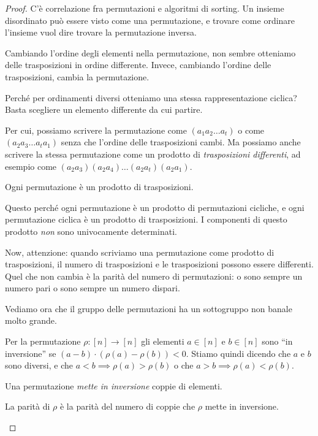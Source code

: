 \begin{proof}
C'\`e correlazione fra permutazioni e algoritmi di sorting.
Un insieme disordinato pu\`o essere visto come una permutazione, e trovare come ordinare l'insieme vuol dire trovare la permutazione inversa.

Cambiando l'ordine degli elementi nella permutazione, non sembre otteniamo delle trasposizioni in ordine differente.
Invece, cambiando l'ordine delle trasposizioni, cambia la permutazione.

Perch\'e per ordinamenti diversi otteniamo una stessa rappresentazione ciclica?
Basta scegliere un elemento differente da cui partire.

Per cui, possiamo scrivere la permutazione come $(a_1 a_2 \dots a_t)$ o come $(a_2 a_3 \dots a_t a_1)$ senza che l'ordine delle trasposizioni cambi.
Ma possiamo anche scrivere la stessa permutazione come un prodotto di \emph{trasposizioni differenti}, ad esempio come $(a_2 a_3) (a_2 a_4) \dots (a_2 a_t) (a_2 a_1)$.

\begin{prop}
	Ogni permutazione \`e un prodotto di trasposizioni.
\end{prop}

Questo perch\'e ogni permutazione \`e un prodotto di permutazioni cicliche, e ogni permutazione ciclica \`e un prodotto di trasposizioni.
I componenti di questo prodotto \emph{non} sono univocamente determinati.

Now, attenzione: quando scriviamo una permutazione come prodotto di trasposizioni, il numero di trasposizioni e le trasposizioni possono essere differenti.
Quel che non cambia \`e la parit\`a del numero di permutazioni: o sono sempre un numero pari o sono sempre un numero dispari.

Vediamo ora che il gruppo delle permutazioni ha un sottogruppo non banale molto grande.

\begin{defn}
	Per la permutazione $\rho : [n] \to [n]$ gli elementi $a \in [n]$ e $b \in [n]$ sono ``in inversione'' se $(a - b) \cdot (\rho(a) - \rho(b)) < 0$.
	Stiamo quindi dicendo che $a$ e $b$ sono diversi, e che $a < b \implies \rho(a) > \rho(b)$ o che $a > b \implies \rho(a) < \rho(b)$.
\end{defn}

Una permutazione \emph{mette in inversione} coppie di elementi.

\begin{defn}
	La parit\`a di $\rho$ \`e la parit\`a del numero di coppie che $\rho$ mette in inversione.
\end{defn}


\end{proof}
